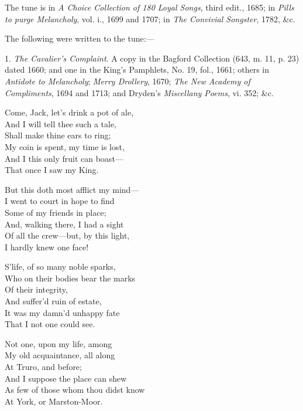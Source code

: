 The tune is in \textit{A Choice Collection of 180 Loyal Songs}, third edit., 1685; in
\textit{Pills to purge Melancholy}, vol. i., 1699 and 1707; in \textit{The Convivial Songster},
1782, \&c.

The following were written to the tune:—

1.\textit{ The Cavalier’s Complaint}. A copy in the Bagford Collection (643, m. 11,
p. 23) dated 1660; and one in the King’s Pamphlets, No. 19, fol., 1661; others
in \textit{Antidote to Melancholy}; \textit{Merry Drollery}, 1670; \textit{The New Academy of Compliments},
1694 and 1713; and Dryden’s \textit{Miscellany Poems}, vi. 352; \&c.

\settowidth{\versewidth}{Come, Jack, let’s drink a pot of ale,}
\begin{dcverse}
\begin{patverse}
Come, Jack, let’s drink a pot of ale,\\
And I will tell thee such a tale,\\
Shall make thine ears to ring;\\
My coin is spent, my time is lost,\\
And I this only fruit can boast—\\
That once I saw my King.
\end{patverse}

\begin{patverse}
But this doth most afflict my mind—\\
I went to court in hope to find\\
Some of my friends in place;\\
And, walking there, I had a sight\\
Of all the crew—but, by this light,\\
I hardly knew one face!
\end{patverse}

\begin{patverse}
S’life, of so many noble sparks,\\
Who on their bodies bear the marks\\
Of their integrity,\\
And suffer’d ruin of estate,\\
It was my damn’d unhappy fate\\
That I not one could see.
\end{patverse}

\begin{patverse}
Not one, upon my life, among\\
My old acquaintance, all along\\
At Truro, and before;\\
And I suppose the place can shew\\
As few of those whom thou didst know\\
At York, or Marston-Moor.
\end{patverse}


\end{dcverse}
